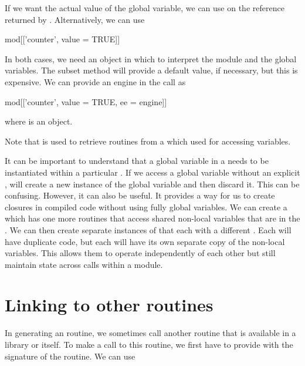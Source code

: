 \documentclass[article]{jss}
\begin{document}
If we want the actual value of the global variable, 
we can use  on the reference
returned by .
Alternatively, we can use
\begin{RCode}
mod[['counter', value = TRUE]]
\end{RCode}
In both cases, we need an  object 
in which to interpret the module and the global variables.
The subset method will provide a default value, if necessary,
but this is expensive.
We can provide an engine in the call as
\begin{RCode}
mod[['counter', value = TRUE, ee = engine]]
\end{RCode}
where  is an  object.

Note that \Rop{\$} is used to retrieve routines from a 
which \Rop{[[} used for accessing variables.

It can be important to understand that a global variable in a
 needs to be instantiated within a particular
.  If we access a global variable without an
explicit ,  will create a new
instance of the global variable and then discard it.  This can be
confusing. However, it can also be useful.  It provides a way for us
to create closures in compiled code without using fully global
variables.  We can create a  which has one more
routines that access shared non-local variables that are in the
.  We can then create separate instances of that
 each with a different .  Each
 will have duplicate code, but each will have
its own separate copy of the non-local variables.  This allows them to
operate independently of each other but still maintain state across
calls within a module.





\section{Linking to other routines}
In generating an \llvm{} routine, we sometimes call another routine
that is available in a library or \R{} itself. 
To make a call to this routine, we first have to provide \llvm{}
with the signature of the routine.
We can use 
\end{document}
